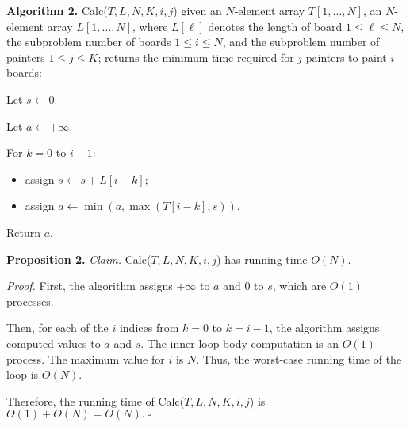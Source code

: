 \begin{enumerate}
\begin{solution}
\textbf{Algorithm 2. }{\sc Calc}($T,L,N,K,i,j$) given an $N$-element array $T[1,\dots,N]$, an $N$-element array $L[1,\dots,N]$, where $L[\ell]$ denotes the length of board $1\leq\ell\leq N$, the subproblem number of boards $1\leq i\leq N$, and the subproblem number of painters $1\leq j\leq K$; returns the minimum time required for $j$ painters to paint $i$ boards:

Let $s\leftarrow 0$.

Let $a\leftarrow+\infty$.

For $k=0$ to $i-1$:
\begin{itemize}
\item assign $s\leftarrow s+L[i-k]$;
\item assign $a\leftarrow\min(a,\max(T[i-k],s))$.
\end{itemize}
Return $a$.

\textbf{Proposition 2. }\textit{Claim. }{\sc Calc}($T,L,N,K,i,j$) has running time $O(N)$.

\textit{Proof. }First, the algorithm assigns $+\infty$ to $a$ and $0$ to $s$, which are $O(1)$ processes.

Then, for each of the $i$ indices from $k=0$ to $k=i-1$, the algorithm assigns computed values to $a$ and $s$. The inner loop body computation is an $O(1)$ process. The maximum value for $i$ is $N$. Thus, the worst-case running time of the loop is $O(N)$.

Therefore, the running time of {\sc Calc}($T,L,N,K,i,j$) is $O(1)+O(N)=O(N).~\square$
\end{solution}
\end{enumerate}